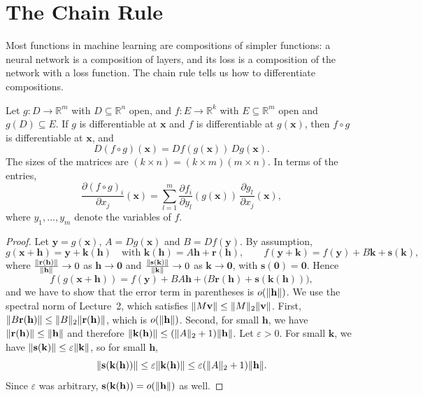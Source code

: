 \section{The Chain Rule}\label{L3-sec:chain-rule}

Most functions in machine learning are compositions of simpler functions: a neural network is a composition of layers, and its loss is a composition of the network with a loss function. The chain rule tells us how to differentiate compositions.

\begin{theorem}\label{L3-thm:chain-rule}
    Let $g: D \to \mathbb{R}^m$ with $D \subseteq \mathbb{R}^n$ open, and $f: E \to \mathbb{R}^k$ with $E \subseteq \mathbb{R}^m$ open and $g(D) \subseteq E$. If $g$ is differentiable at $\mathbf{x}$ and $f$ is differentiable at $g(\mathbf{x})$, then $f \circ g$ is differentiable at $\mathbf{x}$, and
    \[D(f \circ g)(\mathbf{x}) = Df(g(\mathbf{x})) \, Dg(\mathbf{x}).\]
    The sizes of the matrices are $(k \times n) = (k \times m)(m \times n)$. In terms of the entries,
    \[\frac{\partial (f \circ g)_i}{\partial x_j}(\mathbf{x}) = \sum_{l=1}^m \frac{\partial f_i}{\partial y_l}(g(\mathbf{x})) \, \frac{\partial g_l}{\partial x_j}(\mathbf{x}),\]
    where $y_1, \ldots, y_m$ denote the variables of $f$.
\end{theorem}

\begin{proof}
    Let $\mathbf{y} = g(\mathbf{x})$, $A = Dg(\mathbf{x})$ and $B = Df(\mathbf{y})$. By assumption,
    \[g(\mathbf{x} + \mathbf{h}) = \mathbf{y} + \mathbf{k}(\mathbf{h}) \quad \text{with } \mathbf{k}(\mathbf{h}) = A\mathbf{h} + \mathbf{r}(\mathbf{h}), \qquad f(\mathbf{y} + \mathbf{k}) = f(\mathbf{y}) + B\mathbf{k} + \mathbf{s}(\mathbf{k}),\]
    where $\frac{\lVert \mathbf{r}(\mathbf{h}) \rVert}{\lVert \mathbf{h} \rVert} \to 0$ as $\mathbf{h} \to \mathbf{0}$ and $\frac{\lVert \mathbf{s}(\mathbf{k}) \rVert}{\lVert \mathbf{k} \rVert} \to 0$ as $\mathbf{k} \to \mathbf{0}$, with $\mathbf{s}(\mathbf{0}) = \mathbf{0}$. Hence
    \[f(g(\mathbf{x} + \mathbf{h})) = f(\mathbf{y}) + BA\mathbf{h} + \big(B\mathbf{r}(\mathbf{h}) + \mathbf{s}(\mathbf{k}(\mathbf{h}))\big),\]
    and we have to show that the error term in parentheses is $o(\lVert \mathbf{h} \rVert)$. We use the spectral norm of Lecture~2, which satisfies $\lVert M\mathbf{v} \rVert \leq \lVert M \rVert_2 \lVert \mathbf{v} \rVert$. First, $\lVert B\mathbf{r}(\mathbf{h}) \rVert \leq \lVert B \rVert_2 \lVert \mathbf{r}(\mathbf{h}) \rVert$, which is $o(\lVert \mathbf{h} \rVert)$. Second, for small $\mathbf{h}$, we have $\lVert \mathbf{r}(\mathbf{h}) \rVert \leq \lVert \mathbf{h} \rVert$ and therefore $\lVert \mathbf{k}(\mathbf{h}) \rVert \leq (\lVert A \rVert_2 + 1)\lVert \mathbf{h} \rVert$. Let $\varepsilon > 0$. For small $\mathbf{k}$, we have $\lVert \mathbf{s}(\mathbf{k}) \rVert \leq \varepsilon \lVert \mathbf{k} \rVert$, so for small $\mathbf{h}$,
    \[\lVert \mathbf{s}(\mathbf{k}(\mathbf{h})) \rVert \leq \varepsilon \lVert \mathbf{k}(\mathbf{h}) \rVert \leq \varepsilon (\lVert A \rVert_2 + 1) \lVert \mathbf{h} \rVert.\]
    Since $\varepsilon$ was arbitrary, $\mathbf{s}(\mathbf{k}(\mathbf{h})) = o(\lVert \mathbf{h} \rVert)$ as well.
\end{proof}

